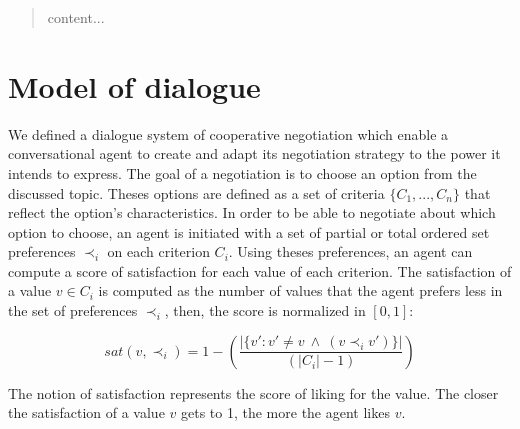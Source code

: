 \documentclass{llncs}
\begin{document}
	\begin{abstract}
		content...
	\end{abstract}
%	
%	
	
	\section{Model of dialogue}
		
		We defined a dialogue system of cooperative negotiation which enable  a conversational agent to create and adapt its negotiation strategy to the power it intends to express. The goal of a negotiation is to choose an option from the discussed topic. Theses options are defined as a set of criteria  $\{C_1, ..., C_n\}$ that reflect the option's characteristics. In order to be able to negotiate about which option to choose, an agent is initiated with a set of partial or total ordered set preferences $\prec_i$ on each criterion $C_i$. Using theses preferences, an agent can compute a score of satisfaction for each value of each criterion. The satisfaction of a value $v \in C_i$ is computed as the number of values that the agent prefers less in the set of preferences $\prec_i$, then, the score is normalized in $[0, 1]$: 
		
				\begin{equation}
				sat(v, \prec_i) =	1 - \left( \frac{|\{v' : v' \neq v \  \wedge \ (v \prec_i v')\}| }{( |C_i| - 1 )}\right)
				\end{equation}
				
		The notion of satisfaction represents the score of liking for the value. The closer the satisfaction of a value $v$ gets to 1, the more the agent likes $v$. 
		
\end{document}
